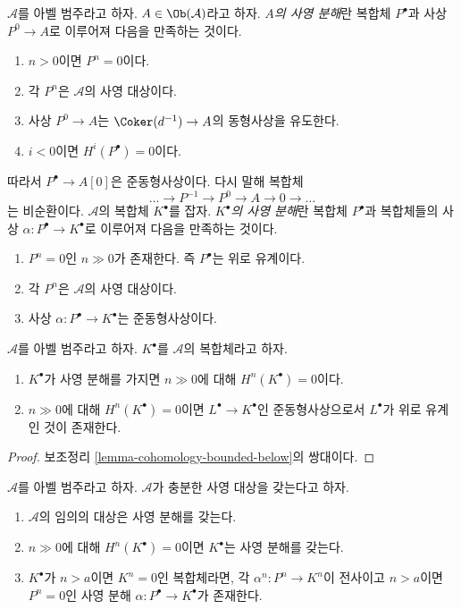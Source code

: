 \begin{definition}
\label{definition-projective-resolution}
$\mathcal{A}$를 아벨 범주라고 하자.
$A \in \Ob(\mathcal{A})$라고 하자.
{\it $A$의 사영 분해}란 복합체 $P^\bullet$과 사상
$P^0 \to A$로 이루어져 다음을 만족하는 것이다.
\begin{enumerate}
\item $n > 0$이면 $P^n = 0$이다.
\item 각 $P^n$은 $\mathcal{A}$의 사영 대상이다.
\item 사상 $P^0 \to A$는 $\Coker(d^{-1}) \to A$의 동형사상을 유도한다.
\item $i < 0$이면 $H^i(P^\bullet) = 0$이다.
\end{enumerate}
따라서 $P^\bullet \to A[0]$은 준동형사상이다.
다시 말해 복합체
$$
\ldots \to P^{-1} \to P^0 \to A \to 0 \to \ldots
$$
는 비순환이다. $\mathcal{A}$의 복합체 $K^\bullet$를 잡자.
{\it $K^\bullet$의 사영 분해}란 복합체 $P^\bullet$과 복합체들의
사상 $\alpha : P^\bullet \to K^\bullet$로 이루어져 다음을 만족하는 것이다.
\begin{enumerate}
\item $P^n = 0$인 $n \gg 0$가 존재한다. 즉 $P^\bullet$는 위로 유계이다.
\item 각 $P^n$은 $\mathcal{A}$의 사영 대상이다.
\item 사상 $\alpha : P^\bullet \to K^\bullet$는 준동형사상이다.
\end{enumerate}
\end{definition}

\begin{lemma}
\label{lemma-cohomology-bounded-above}
$\mathcal{A}$를 아벨 범주라고 하자.
$K^\bullet$를 $\mathcal{A}$의 복합체라고 하자.
\begin{enumerate}
\item $K^\bullet$가 사영 분해를 가지면 $n \gg 0$에 대해
$H^n(K^\bullet) = 0$이다.
\item $n \gg 0$에 대해 $H^n(K^\bullet) = 0$이면
$L^\bullet \to K^\bullet$인 준동형사상으로서 $L^\bullet$가
위로 유계인 것이 존재한다.
\end{enumerate}
\end{lemma}

\begin{proof}
보조정리 \ref{lemma-cohomology-bounded-below}의 쌍대이다.
\end{proof}

\begin{lemma}
\label{lemma-projective-resolutions-exist}
$\mathcal{A}$를 아벨 범주라고 하자. $\mathcal{A}$가 충분한 사영 대상을 갖는다고 하자.
\begin{enumerate}
\item $\mathcal{A}$의 임의의 대상은 사영 분해를 갖는다.
\item $n \gg 0$에 대해 $H^n(K^\bullet) = 0$이면
$K^\bullet$는 사영 분해를 갖는다.
\item $K^\bullet$가 $n > a$이면 $K^n = 0$인 복합체라면,
각 $\alpha^n : P^n \to K^n$이 전사이고 $n > a$이면 $P^n = 0$인
사영 분해 $\alpha : P^\bullet \to K^\bullet$가 존재한다.
\end{enumerate}
\end{lemma}

